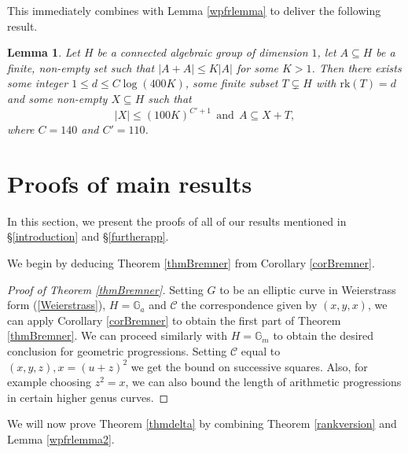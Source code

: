 \documentclass[12pt, reqno]{amsart}
\newcommand{\G}{\mathbb{G}}
\newcommand{\rk}{\mathrm{rk}}
\newtheorem{lemma}[theorem]{Lemma}
\theoremstyle{remark}
\theoremstyle{definition}
\numberwithin{equation}{section}
\begin{document}
This immediately combines with Lemma \ref{wpfrlemma} to deliver the following result. 

\begin{lemma} \label{coveringlemma}
     Let $H$ be a connected algebraic group of dimension $1$, let $A \subseteq H$ be a finite, non-empty set such that $|A+A| \leq K|A|$ for some $K > 1$. Then there exists some integer $1 \leq d \leq C\log (400K)$, some finite subset $T \subsetneq H$ with $\rk(T) = d$ and some non-empty $X \subseteq H$ such that 
     \[ |X| \leq (100K)^{C'+1} \ \ \text{and} \ \  A \subseteq X + T,\]
     where $C = 140$ and $C' = 110$.
\end{lemma}





\section{Proofs of main results} \label{alltheproofs}

In this section, we present the proofs of all of our results mentioned in \S\ref{introduction} and \S\ref{furtherapp}. 

We begin by deducing Theorem \ref{thmBremner} from Corollary \ref{corBremner}. 

\begin{proof}[Proof  of Theorem \ref{thmBremner}]
Setting $G $ to be an elliptic curve in Weierstrass form (\ref{Weierstrass}), $H = \G_a$ and $\mathcal{C}$ the correspondence given by $(x,y,x)$, we can apply  Corollary \ref{corBremner} to obtain the first part of Theorem \ref{thmBremner}. We can proceed similarly with $H = \G_m$ to obtain the desired conclusion for geometric progressions. Setting $\mathcal{C}$ equal to $(x,y,z), x = (u + z)^2$ we get the bound on successive squares. Also, for example choosing $z^2 = x$, we can also bound the length of arithmetic progressions in certain higher genus curves. 
\end{proof}

We will now prove Theorem \ref{thmdelta} by combining Theorem \ref{rankversion} and Lemma \ref{wpfrlemma2}.
\end{document}
